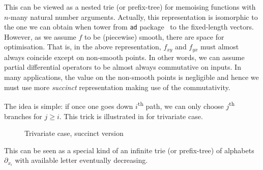 \documentclass[./rims-smooth-paper.tex]{subfiles}
\begin{document}
This can be viewed as a nested trie (or prefix-tree) for memoising functions with $n$-many natural number arguments.
Actually, this representation is isomorphic to the one we can obtain when  tower from \texttt{ad} package~\cite{Kmett:2010aa} to the fixed-length vectors.
However, as we assume $f$ to be (piecewise) smooth, there are space for optimisation.
That is, in the above representation, $f_{xy}$ and $f_{yx}$ must almost always coincide except on non-smooth points.
In other words, we can assume partial differential operators to be almost always commutative on inputs.
In many applications, the value on the non-smooth points is negligible and hence we must use more \emph{succinct} representation making use of the commutativity.

The idea is simple: if once one goes down $i$\textsuperscript{th} path, we can only choose $j$\textsuperscript{th} branches for $j \geq i$.
This trick is illustrated in  for trivariate case.
\begin{figure}[tbp]
  \centering
  \caption{Trivariate case, succinct version\label{fig:tree}}
\end{figure}
This can be seen as a special kind of an infinite trie (or prefix-tree) of alphabets $\partial_{x_i}$ with available letter eventually decreasing.
\end{document}
